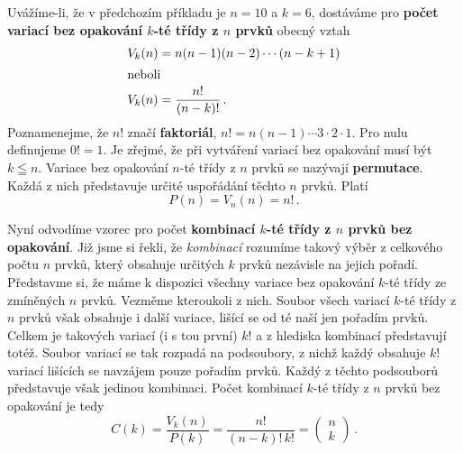       
      
      Uvážíme-li, že v předchozím příkladu je \(n = 10\) a \(k = 6\), dostáváme pro \textbf{počet 
      variací bez opakování \(k\)-té třídy z \(n\) prvků} obecný vztah
      \begin{align}
        V_k(n) &= n(n-1)(n-2)\cdots(n-k+1)  \nonumber \\
        \shortintertext{neboli}
        V_k(n) &= \frac{n!}{(n-k)!}\, .    \label{mai:eq008}
      \end{align}
      Poznamenejme, že \(n!\) značí \textbf{faktoriál}, \(n! = n(n - 1)\cdots 3 \cdot 2 \cdot 1\). 
      Pro nulu definujeme \(0! = 1\). Je zřejmé, že při vytváření variací bez opakování musí být 
      \(k\leqq n\). Variace bez opakování \(n\)-té třídy z \(n\) prvků se nazývají 
      \textbf{permutace}. Každá z nich představuje určité uspořádání těchto \(n\) prvků. Platí
      \begin{equation}\label{mai:eq009}
        \boxed{P(n) = V_n(n) = n!}\, .
      \end{equation}
      
      Nyní odvodíme vzorec pro počet \textbf{kombinací \(k\)-té třídy z \(n\) prvků bez opakování}. 
      Již jsme si řekli, že \emph{kombinací} rozumíme takový výběr z celkového počtu \(n\) prvků, 
      který obsahuje určitých \(k\) prvků nezávisle na jejich pořadí. Představme si, že máme k 
      dispozici všechny variace bez opakování \(k\)-té třídy ze zmíněných \(n\) prvků. Vezměme 
      kteroukoli z nich. Soubor všech variací \(k\)-té třídy z \(n\) prvků však obsahuje i další 
      variace, lišící se od té naší jen pořadím prvků. Celkem je takových variací (i s tou první) 
      \(k!\) a z hlediska kombinací představují totéž. Soubor variací se tak rozpadá na podsoubory, 
      z nichž každý obsahuje \(k!\) variací lišících se navzájem pouze pořadím prvků. Každý z 
      těchto podsouborů představuje však jedinou kombinaci. Počet kombinací \(k\)-té třídy z \(n\) 
      prvků bez opakování je tedy
      \begin{equation}\label{mai:eq010}
        \boxed{C(k) = \frac{V_k(n)}{P(k)} = \frac{n!}{(n-k)!\,k!} = 
               \begin{pmatrix}
                n \\
                k
               \end{pmatrix}}\, .
      \end{equation}
      
